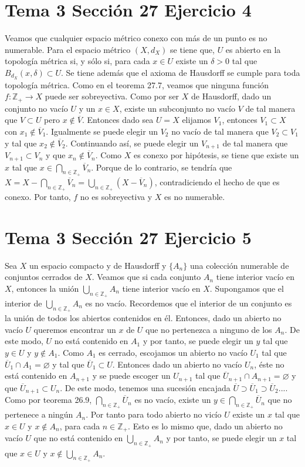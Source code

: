 \documentclass{article}
\begin{document}
\section{Tema 3 Sección 27 Ejercicio 4}
Veamos que cualquier espacio métrico conexo con más de un punto es no numerable. Para el espacio métrico $(X,d_X)$ se tiene que, $U$ es abierto en la topología métrica si, y sólo si, para cada $x\in U$ existe un $\delta>0$ tal que $B_{d_X}(x,\delta)\subset U$. Se tiene además que el axioma de Hausdorff se cumple para toda topología métrica. Como en el teorema 27.7, veamos que ninguna función $f:\mathbb{Z}_+\rightarrow X$ puede ser sobreyectiva. Como por ser $X$ de Hausdorff, dado un conjunto no vacío $U$ y un $x\in X$, existe un subconjunto no vacío $V$ de tal manera que $V\subset U$ pero $x\notin \overline{V}$. Entonces dado sea $U=X$ elijamos $V_1$, entonces $V_1\subset X$ con $x_1\notin \overline{V}_1$. Igualmente se puede elegir un $V_2$ no vacío de tal manera que $V_2\subset V_1$ y tal que $x_2\notin \overline{V}_2$. Continuando así, se puede elegir un $V_{n+1}$ de tal manera que $V_{n+1}\subset V_n$ y que $x_n\notin \overline{V}_n$.  Como $X$ es conexo por hipótesis, se tiene que existe un $x$ tal que $x\in\bigcap_{n\in \mathbb{Z}_+} \overline{V}_n$. Porque de lo contrario, se tendría que $X=X-\bigcap_{n\in \mathbb{Z}_+} \overline{V}_n=\bigcup_{n\in \mathbb{Z}_+} (X-\overline{V}_n)$, contradiciendo el hecho de que es conexo. Por tanto, $f$ no es sobreyectiva y $X$ es no numerable.
\section{Tema 3 Sección 27 Ejercicio 5}
Sea $X$ un espacio compacto y de Hausdorff y $\{A_n\}$ una colección numerable de conjuntos cerrados de $X$. Veamos que si cada conjunto $A_n$ tiene interior vacío en $X$, entonces la unión $\bigcup_{n\in\mathbb{Z}_+} A_n$ tiene interior vacío en $X$. Supongamos que el interior de $\bigcup_{n\in\mathbb{Z}_+} A_n$ es no vacío. Recordemos que el interior de un conjunto es la unión de todos los abiertos contenidos en él. Entonces, dado un abierto no vacío $U$ queremos encontrar un $x$ de $U$ que no pertenezca a ninguno de los $A_n$. De este modo, $U$ no está contenido en $A_1$ y por tanto, se puede elegir un $y$ tal que $y\in U$ y $y\notin A_1$. Como $A_1$ es cerrado, escojamos un abierto no vacío $U_1$ tal que $\overline{U}_1\cap A_1=\varnothing$ y tal que $\overline{U}_1\subset U$. Entonces dado un abierto no vacío $U_{n}$, éste no está contenido en $A_{n+1}$ y se puede escoger un $U_{n+1}$ tal que $\overline{U}_{n+1}\cap A_{n+1}=\varnothing$ y que $\overline{U}_{n+1}\subset U_n$. De este modo, tenemos una sucesión encajada $\overline{U}\supset \overline{U}_1\supset \overline{U}_2...$. Como por teorema 26.9, $\bigcap_{n\in{\mathbb{Z}_+}}\overline{U}_n$ es no vacío, existe un $y\in \bigcap_{n\in\mathbb{Z}_+}\overline{U}_n$ que no pertenece a ningún $A_n$. Por tanto para todo abierto no vicío $U$ existe un $x$ tal que $x\in U$ y $x\notin A_n$, para cada $n\in \mathbb{Z}_+$. Esto es lo mismo que, dado un abierto no vacío $U$ que no está contenido en $\bigcup_{n\in \mathbb{Z}_+} A_n$ y por tanto, se puede elegir un $x$ tal que $x\in U$ y $x\notin \bigcup_{n\in \mathbb{Z}_+} A_n$.
\end{document}
